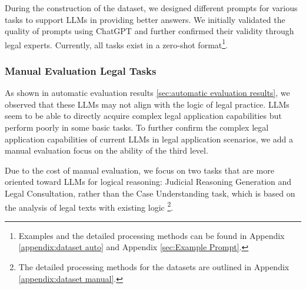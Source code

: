 During the construction of the dataset, we designed different prompts for various tasks to support LLMs in providing better answers. We initially validated the quality of prompts using ChatGPT and further confirmed their validity through legal experts. Currently, all tasks exist in a zero-shot format\footnote{Examples 
and the detailed processing methods can be found in Appendix \ref{appendix:dataset auto} and Appendix \ref{sec:Example Prompt}.}.

\subsubsection{Manual Evaluation Legal Tasks}
As shown in automatic evaluation results \ref{sec:automatic evaluation results}, we observed that these LLMs may not align with the logic of legal practice. LLMs seem to be able to directly acquire complex legal application capabilities but perform poorly in some basic tasks. To further confirm the complex legal application capabilities of current LLMs in legal application scenarios, we add a manual evaluation focus on the ability of the third level.

Due to the cost of manual evaluation, we focus on two tasks that are more oriented toward LLMs for logical reasoning: Judicial Reasoning Generation and Legal Consultation, rather than the Case Understanding task, which is based on the analysis of legal texts with existing logic \footnote{The detailed processing methods for the datasets are outlined in Appendix \ref{appendix:dataset manual}.}.

